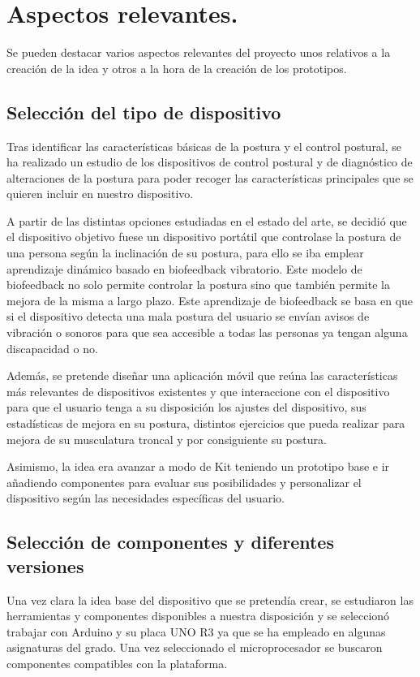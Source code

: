 \section{Aspectos relevantes.}

Se pueden destacar varios aspectos relevantes del proyecto unos relativos a la creación de la idea y otros a la hora de la creación de los prototipos.

\subsection{Selección del tipo de dispositivo}
Tras identificar las características básicas de la postura y el control postural, se ha realizado un estudio de los dispositivos de control postural y de diagnóstico de alteraciones de la postura para poder recoger las características principales que se quieren incluir en nuestro dispositivo. 

A partir de las distintas opciones estudiadas en el estado del arte, se decidió que el dispositivo objetivo fuese un dispositivo portátil que controlase la postura de una persona según la inclinación de su postura, para ello se iba emplear aprendizaje dinámico basado en biofeedback vibratorio. Este modelo de biofeedback no solo permite controlar la postura sino que también permite la mejora de la misma a largo plazo. Este aprendizaje de biofeedback se basa en que si el dispositivo detecta una mala postura del usuario se envían avisos de vibración o sonoros para que sea accesible a todas las personas ya tengan alguna discapacidad o no. 

Además, se pretende diseñar una aplicación móvil que reúna las características más relevantes de dispositivos existentes y que interaccione con el dispositivo para que el usuario tenga a su disposición los ajustes del dispositivo, sus estadísticas de mejora en su postura, distintos ejercicios que pueda realizar para mejora de su musculatura troncal y por consiguiente su postura.

Asimismo, la idea era avanzar a modo de Kit teniendo un prototipo base e ir añadiendo componentes para evaluar sus posibilidades y personalizar el dispositivo según las necesidades específicas del usuario.

\subsection{Selección de componentes y diferentes versiones}
Una vez clara la idea base del dispositivo que se pretendía crear, se estudiaron las herramientas y componentes disponibles a nuestra disposición y se seleccionó trabajar con Arduino y su placa UNO R3 ya que se ha empleado en algunas asignaturas del grado. Una vez seleccionado el microprocesador se buscaron componentes compatibles con la plataforma.

